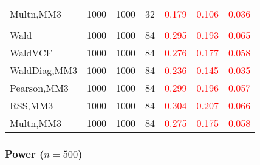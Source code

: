 \documentclass[
]{article}
\begin{document}
\begin{table}[H]
{\begin{tabular}[t]{lrrrrrr}
\hspace{1em}Multn,MM3 & 1000 & 1000 & 32 & \textcolor{red}{0.179} & \textcolor{red}{0.106} & \textcolor{red}{0.036}\\
\addlinespace[0.3em]
\multicolumn{7}{l}{\textbf{3F 15V}}\\
\hspace{1em}Wald & 1000 & 1000 & 84 & \textcolor{red}{0.295} & \textcolor{red}{0.193} & \textcolor{red}{0.065}\\
\hspace{1em}WaldVCF & 1000 & 1000 & 84 & \textcolor{red}{0.276} & \textcolor{red}{0.177} & \textcolor{red}{0.058}\\
\hspace{1em}WaldDiag,MM3 & 1000 & 1000 & 84 & \textcolor{red}{0.236} & \textcolor{red}{0.145} & \textcolor{red}{0.035}\\
\hspace{1em}Pearson,MM3 & 1000 & 1000 & 84 & \textcolor{red}{0.299} & \textcolor{red}{0.196} & \textcolor{red}{0.057}\\
\hspace{1em}RSS,MM3 & 1000 & 1000 & 84 & \textcolor{red}{0.304} & \textcolor{red}{0.207} & \textcolor{red}{0.066}\\
\hspace{1em}Multn,MM3 & 1000 & 1000 & 84 & \textcolor{red}{0.275} & \textcolor{red}{0.175} & \textcolor{red}{0.058}\\
\bottomrule
\end{tabular}}
\endgroup{}
\end{table}

\hypertarget{power-n500-1}{%
\subsubsection{\texorpdfstring{Power
(\(n=500\))}{Power (n=500)}}\label{power-n500-1}}
\end{document}
